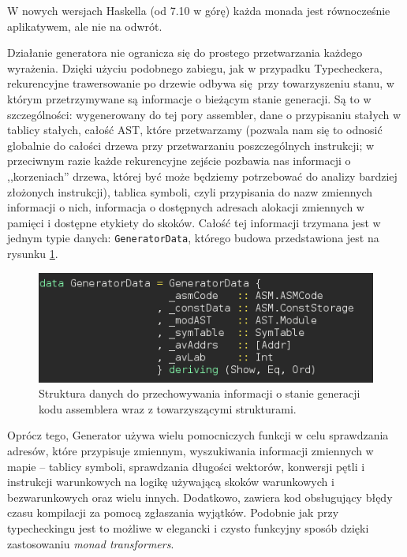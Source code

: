 W nowych wersjach Haskella (od 7.10 w górę) każda monada jest równocześnie aplikatywem, ale nie na odwrót.

Działanie generatora nie ogranicza się do prostego przetwarzania każdego wyrażenia. Dzięki użyciu podobnego zabiegu, jak w przypadku Typecheckera, rekurencyjne trawersowanie po drzewie odbywa się przy towarzyszeniu stanu, w którym przetrzymywane są informacje o bieżącym stanie generacji. Są to w szczególności: wygenerowany do tej pory assembler, dane o przypisaniu stałych w tablicy stałych, całość AST, które przetwarzamy (pozwala nam się to odnosić globalnie do całości drzewa przy przetwarzaniu poszczególnych instrukcji; w przeciwnym razie każde rekurencyjne zejście pozbawia nas informacji o ,,korzeniach'' drzewa, której być może będziemy potrzebować do analizy bardziej złożonych instrukcji), tablica symboli, czyli przypisania do nazw zmiennych informacji o nich, informacja o dostępnych adresach alokacji zmiennych w pamięci i dostępne etykiety do skoków. Całość tej informacji trzymana jest w jednym typie danych: \texttt{GeneratorData}, którego budowa przedstawiona jest na rysunku \ref{fig:generator-data}.

\begin{figure}
  \begin{center}
    \includegraphics[scale=0.5]{images/generator-data.png}
    \caption{Struktura danych do przechowywania informacji o stanie generacji kodu assemblera wraz z towarzyszącymi strukturami.}
    \label{fig:generator-data}
  \end{center}
\end{figure}

Oprócz tego, Generator używa wielu pomocniczych funkcji w celu sprawdzania adresów, które przypisuje zmiennym, wyszukiwania informacji zmiennych w mapie -- tablicy symboli, sprawdzania długości wektorów, konwersji pętli i instrukcji warunkowych na logikę używającą skoków warunkowych i bezwarunkowych oraz wielu innych. Dodatkowo, zawiera kod obsługujący błędy czasu kompilacji za pomocą zgłaszania wyjątków. Podobnie jak przy typecheckingu jest to możliwe w elegancki i czysto funkcyjny sposób dzięki zastosowaniu \textit{monad transformers}.

